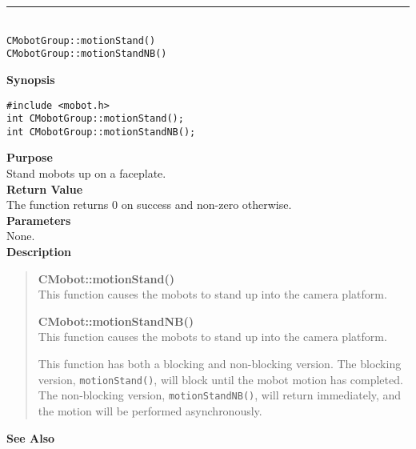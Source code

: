 \noindent
\vspace{5pt}
\rule{4.5in}{0.015in}\\
\noindent
{\LARGE \texttt{CMobotGroup::motionStand()}}\\
{\LARGE \texttt{CMobotGroup::motionStandNB()}}\\
{}

\noindent
{\bf Synopsis}
\vspace{-8pt}
\begin{verbatim}
#include <mobot.h>
int CMobotGroup::motionStand();
int CMobotGroup::motionStandNB();
\end{verbatim}

\noindent
{\bf Purpose}\\
Stand mobots up on a faceplate.\\

\noindent
{\bf Return Value}\\
The function returns 0 on success and non-zero otherwise.\\

\noindent
{\bf Parameters}\\
None.\\

\noindent
{\bf Description}\\
\vspace{-12pt}
\begin{quote}
{\bf CMobot::motionStand()}\\
This function causes the mobots to stand up into the camera platform.

{\bf CMobot::motionStandNB()}\\
This function causes the mobots to stand up into the camera platform.

This function has both a blocking and non-blocking version.
The blocking version, \texttt{motionStand()}, will block until the
mobot motion has completed. The non-blocking version, \texttt{motionStandNB()},
will return immediately, and the motion will be performed asynchronously.\\
\end{quote}

\noindent
{\bf See Also}\\

